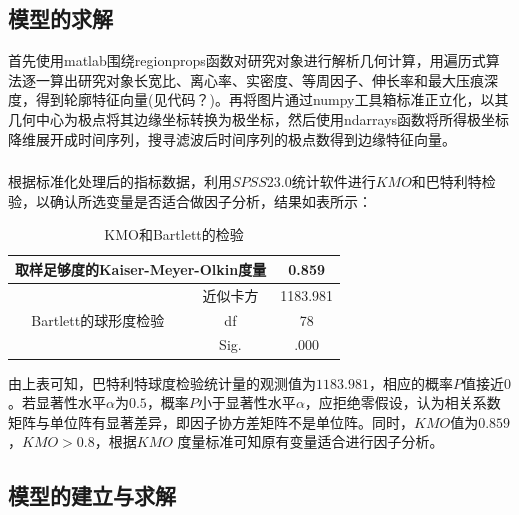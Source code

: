 \documentclass{whutmod}
\begin{document}
\begin{itemize}
	      \subsection{模型的求解}
	      首先使用matlab围绕regionprops函数对研究对象进行解析几何计算，用遍历式算法逐一算出研究对象长宽比、离心率、实密度、等周因子、伸长率和最大压痕深度，得到轮廓特征向量(见代码？)。再将图片通过numpy工具箱标准正立化，以其几何中心为极点将其边缘坐标转换为极坐标，然后使用ndarrays函数将所得极坐标降维展开成时间序列，搜寻滤波后时间序列的极点数得到边缘特征向量。
	     
		\subsubsection{}
		根据标准化处理后的指标数据，利用$SPSS23.0$统计软件进行$KMO$和巴特利特检验，以确认所选变量是否适合做因子分析，结果如表\label{tab1}所示：
		\begin{table}[H]
			\centering
			\caption{KMO和Bartlett的检验}\label{tab1}
			\begin{tabular}{cc|cc|cc}
				\toprule[1.5pt]
				\multicolumn{4}{c|}{取样足够度的Kaiser-Meyer-Olkin度量} & \multicolumn{2}{c}{0.859} \\
				\midrule
				\multicolumn{2}{c|}{\multirow{3}[2]{*}{Bartlett的球形度检验}} & \multicolumn{2}{c|}{近似卡方} & \multicolumn{2}{c}{1183.981} \\
				\multicolumn{2}{c|}{} & \multicolumn{2}{c|}{df} & \multicolumn{2}{c}{78} \\
				\multicolumn{2}{c|}{} & \multicolumn{2}{c|}{Sig.} & \multicolumn{2}{c}{.000} \\
				\bottomrule[2pt]
			\end{tabular}%
			\label{tab:addlabel}%
		\end{table}%
		
		由上表可知，巴特利特球度检验统计量的观测值为$1183.981$，相应的概率$P$值接近$0$。若显著性水平$α$为$0.5$，概率$P$小于显著性水平$α$，应拒绝零假设，认为相关系数矩阵与单位阵有显著差异，即因子协方差矩阵不是单位阵。同时，$KMO$值为$0.859$，$KMO>0.8$，根据$KMO$ 度量标准可知原有变量适合进行因子分析。
		
		
		

	\subsection{模型的建立与求解}

\end{itemize}
\end{document}
